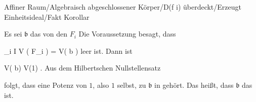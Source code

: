 {Affiner Raum/Algebraisch abgeschlossener Körper/D(f i) überdeckt/Erzeugt Einheitsideal/Fakt}
{Korollar}
{}
{



\faktsituation {}
\faktzusatz {}
\faktzusatz {}





}
{





Es sei ${\mathfrak b}$ das von den $F_i$
Die Voraussetzung besagt, dass

\mavergleichskettedisp
{\vergleichskette
{ \bigcap_{i \in I} V \left(  F_i  \right)
}
{ =} { V( {\mathfrak b} )
}
{ } {
}
{ } {
}
{ } {
}
}
{}{}{}
leer ist. Dann ist

\mavergleichskette
{\vergleichskette
{ V( {\mathfrak b})
}
{ \subseteq }{ V(1)
}
{  }{
}
{    }{
}
{   }{
}
}
{}{}{.}
Aus
dem
Hilbertschen Nullstellensatz

folgt, dass eine Potenz von $1$, also $1$ selbst, zu ${\mathfrak b}$ in
 gehört. Das heißt, dass ${\mathfrak b}$ das
ist.




}






